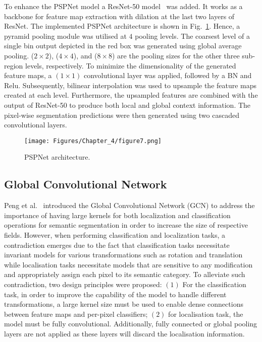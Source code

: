 To enhance the PSPNet model a ResNet-50 model~\cite{He2016} was added. 
It works as a backbone for feature map extraction with dilation at the last two layers of ResNet. 
The implemented PSPNet architecture is shown in Fig.~\ref{fig:PSPNet}.
Hence, a pyramid pooling module was utilised at \(4\) pooling levels.
The coarsest level of a single bin output depicted in the red box was generated using global average pooling.
(\(2\times2\)), (\(4\times 4\)), and (\(8\times8\)) are the pooling sizes for the other three sub-region levels, respectively.
To minimize the dimensionality of the generated feature maps, a \((1\times 1)\) convolutional layer was applied, followed by a BN and Relu.
Subsequently, bilinear interpolation was used to upsample the feature maps created at each level.
Furthermore, the upsampled features are combined with the output of ResNet-50 to produce both local and global context information.
The pixel-wise segmentation predictions were then generated using two cascaded convolutional layers. 
\begin{figure} [h!]
	\centering
	\texttt{[image: Figures/Chapter\_4/figure7.png]}
	\caption{PSPNet architecture.} 
	\label{fig:PSPNet}
\end{figure} 
\subsection{Global Convolutional Network}
Peng et al.~\cite{Peng2017} introduced the Global Convolutional Network (GCN) to address the importance of having large kernels for both localization and classification operations for semantic segmentation in order to increase the size of respective fields.
However, when performing classification and localization tasks, a contradiction emerges due to the fact that classification tasks necessitate invariant models for various transformations such as rotation and translation while localisation tasks necessitate models that are sensitive to any modification and appropriately assign each pixel to its semantic category.
To alleviate such contradiction, two design principles were proposed:
\((1)\) For the classification task, in order to improve the capability of 
the model to handle different transformations, a large kernel size must be 
used to enable dense connections between feature maps and per-pixel 
classifiers; \((2)\) for localisation task, the model must be fully convolutional. 
Additionally, fully connected or global pooling layers are not applied as 
these layers will discard the localisation information. 

